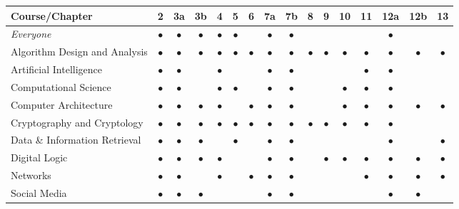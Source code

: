 
\noindent
\begin{tabular}{|l||c|c|c|c|c|c|c|c|c|c|c|c|c|c|c|}
\hline
{\bf Course}/{\bf Chapter}
   & 2 & 3a & 3b & 4 & 5 & 6 & 7a & 7b & 8 & 9 & 10 & 11 & 12a & 12b & 13 \\
\hline
\hline
{\em Everyone} 
   & $\bullet$ & $\bullet$ & $\bullet$ & $\bullet$ & $\bullet$ &  & $\bullet$ & $\bullet$ &  &  &  &  & $\bullet$ & &  \\
\hline
Algorithm Design and Analysis
   & $\bullet$ & $\bullet$ & $\bullet$ & $\bullet$ & $\bullet$ & $\bullet$ & $\bullet$ & $\bullet$ & $\bullet$ & $\bullet$ & $\bullet$ & $\bullet$ & $\bullet$ & $\bullet$ & $\bullet$ \\
   \hline
Artificial Intelligence
   & $\bullet$ & $\bullet$ & & $\bullet$ &  &  & $\bullet$ & $\bullet$ &  &  &  & $\bullet$ & $\bullet$ & &  \\
   \hline
Computational Science
   & $\bullet$ & $\bullet$ & & $\bullet$ & $\bullet$ &  & $\bullet$ & $\bullet$ &  &  & $\bullet$ & $\bullet$ & $\bullet$ &  &  \\
\hline
Computer Architecture 
   & $\bullet$ & $\bullet$ & $\bullet$ & $\bullet$ &  & $\bullet$ & $\bullet$ & $\bullet$ &  &  & $\bullet$ & $\bullet$ & $\bullet$ & $\bullet$ & $\bullet$ \\
\hline
Cryptography and Cryptology 
   & $\bullet$ & $\bullet$ & $\bullet$ & $\bullet$ & $\bullet$ & $\bullet$ & $\bullet$ & $\bullet$ & $\bullet$ & $\bullet$ & $\bullet$ & $\bullet$ & $\bullet$ & &  \\
\hline
Data \& Information Retrieval
   & $\bullet$ & $\bullet$ & $\bullet$ & & $\bullet$ &  & $\bullet$ & $\bullet$ &  &  &  &  & $\bullet$ & & $\bullet$ \\
\hline
Digital Logic 
   & $\bullet$ & $\bullet$ & $\bullet$ & $\bullet$ &  &  & $\bullet$ & $\bullet$ &  & $\bullet$ & $\bullet$ & $\bullet$ & $\bullet$ & $\bullet$ & $\bullet$ \\
\hline
Networks
   & $\bullet$ & $\bullet$ & & $\bullet$ &  & $\bullet$ & $\bullet$ & $\bullet$ &  &  &  & $\bullet$ & $\bullet$ & $\bullet$ & $\bullet$ \\
\hline
Social Media 
   & $\bullet$ & $\bullet$ & $\bullet$ &  &  &  & $\bullet$ & $\bullet$ &  &  &  &  & $\bullet$ & $\bullet$ &  \\

\end{tabular}
